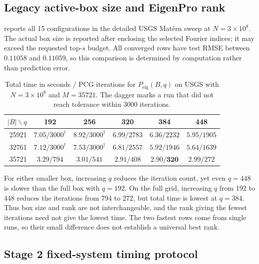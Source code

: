 \subsection{Legacy active-box size and EigenPro rank}
\label{subsec:box-rank-sweep}

 reports all 15 configurations in the detailed USGS
Mat\'ern sweep at \(N=3\times10^8\). The actual box size is reported after
enclosing the selected Fourier indices; it may exceed the requested top-\(s\)
budget. All converged rows have test RMSE between \(0.11058\) and \(0.11059\),
so this comparison is determined by computation rather than prediction error.

\begin{table}[H]
\centering
\caption{Total time in seconds / PCG iterations for
\(P_{\mathrm{eig}}(B,q)\) on USGS with \(N=3\times10^8\) and \(M=35721\).
The dagger marks a run that did not reach tolerance within 3000 iterations.}
\label{tab:box-rank-sweep}
\begin{tabular}{rccccc}
\toprule
\(|B|\backslash q\) & 192 & 256 & 320 & 384 & 448 \\
\midrule
25921 & \(7.05/3000^\dagger\) & \(8.92/3000^\dagger\) & \(6.99/2783\) & \(6.36/2232\) & \(5.95/1905\) \\
32761 & \(7.12/3000^\dagger\) & \(7.53/3000^\dagger\) & \(6.81/2557\) & \(5.92/1946\) & \(5.64/1639\) \\
35721 & \(3.29/794\) & \(3.01/541\) & \(2.91/408\) & \(\mathbf{2.90/320}\) & \(2.99/272\) \\
\bottomrule
\end{tabular}
\end{table}

For either smaller box, increasing \(q\) reduces the iteration count, yet even
\(q=448\) is slower than the full box with \(q=192\). On the full grid,
increasing \(q\) from 192 to 448 reduces the iterations from 794 to 272, but
total time is lowest at \(q=384\). Thus box size and rank are not
interchangeable, and the rank giving the fewest iterations need not give the
lowest time. The two fastest rows come from single runs, so their small
difference does not establish a universal best rank.

\subsection{Stage 2 fixed-system timing protocol}

